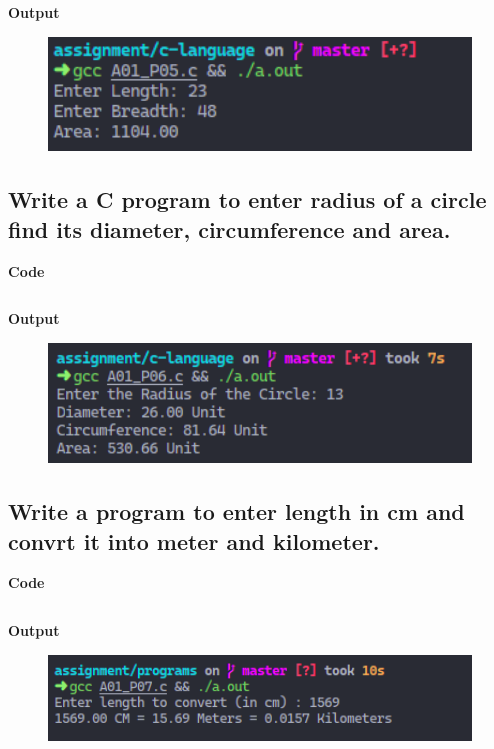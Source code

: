 \documentclass[a4paper]{article}
\begin{document}
\inputminted{C}{programs/A01_P05.c}

\textbf{Output}

\begin{figure}[h]
  \includegraphics[width=12cm]{A01_P05}
\end{figure}

\newpage



\subsection{Write a C program to enter radius of a circle find its diameter, circumference and area.}
\textbf{Code}

\inputminted{C}{programs/A01_P06.c}

\textbf{Output}

\begin{figure}[h]
  \includegraphics[width=12cm]{A01_P06}
\end{figure}

\newpage



\subsection{Write a program to enter length in cm and convrt it into meter and kilometer.}
\textbf{Code}

\inputminted{C}{programs/A01_P07.c}

\textbf{Output}

\begin{figure}[h]
  \includegraphics[width=12cm]{A01_P07}
\end{figure}
\end{document}
